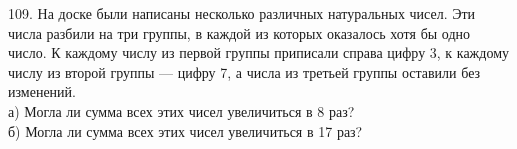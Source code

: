109. На доске были написаны несколько различных натуральных чисел. Эти числа разбили на три группы, в каждой из которых оказалось хотя бы одно число.
К каждому числу из первой группы приписали справа цифру 3, к каждому числу из второй группы --- цифру 7, а числа из третьей группы оставили без изменений.\\
а) Могла ли сумма всех этих чисел увеличиться в 8 раз?\\
б) Могла ли сумма всех этих чисел увеличиться в 17 раз?\\
